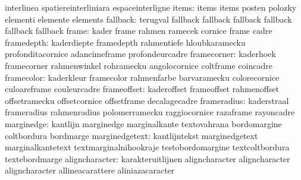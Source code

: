                            interlinea                spatiereinterliniara
                           espaceinterligne
                    items: items                     items
                           posten                    polozky
                           elementi                  elemente
                           elements
                 fallback: terugval                  fallback
                           fallback                  fallback
                           fallback                  fallback
                           fallback
                    frame: kader                     frame
                           rahmen                    ramecek
                           cornice                   frame
                           cadre
               framedepth: kaderdiepte               framedepth
                           rahmentiefe               hloubkaramecku
                           profonditacornice         adancimeframe
                           profondeurcadre
              framecorner: kaderhoek                 framecorner
                           rahmenwinkel              rohramecku
                           angolocornice             coltframe
                           coincadre
               framecolor: kaderkleur                framecolor
                           rahmenfarbe               barvaramecku
                           colorecornice             culoareframe
                           couleurcadre
              frameoffset: kaderoffset               frameoffset
                           rahmenoffset              offsetramecku
                           offsetcornice             offsetframe
                           decalagecadre
              frameradius: kaderstraal               frameradius
                           rahmenradius              polomerramecku
                           raggiocornice             razaframe
                           rayoncadre
               marginedge: kantlijn                  marginedge
                           marginalkante             textovahrana
                           bordomargine              coltbordura
                           bordmarge
           marginedgetext: kantlijntekst             marginedgetext
                           marginalkantetext         textmarginalnihookraje
                           testobordomargine         textcoltbordura
                           textebordmarge
           aligncharacter: karakteruitlijnen         aligncharacter
                           aligncharacter            aligncharacter
                           allineacarattere          aliniazacaracter

